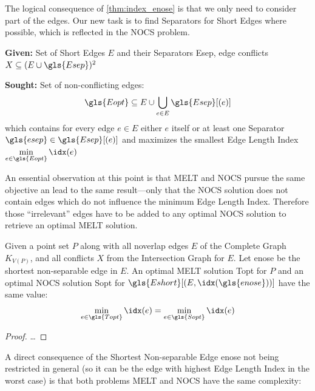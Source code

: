 The logical consequence of \cref{thm:index_enose} is that we only need
to consider part of the edges. Our new task is to find Separators for
Short Edges where possible, which is reflected in the \gls{NOCS}
problem.

\begin{problem}
  \hfill
  \begin{labeling}{\hspace{4em}}
    \item[\textbf{Given:}]
      Set of Short Edges \(E\) and their Separators \gls{Esep},
      edge conflicts \(X \subseteq (E \cup \gls{Esep})^2\)
    \item[\textbf{Sought:}]
      Set of non-conflicting edges:
      \[
        \gls{Eopt} \subseteq E
        \cup \bigcup\limits_{e \in E} \gls{Esep}[(e)]
      \]
      which contains for every edge \(e \in E\) either \(e\) itself
      or at least one Separator \(\gls{esep} \in \gls{Esep}[(e)]\)
      and maximizes the smallest Edge Length Index
      \(\min\limits_{e \in \gls{Eopt}} \idx(e)\)
  \end{labeling}
\end{problem}

An essential observation at this point is that \gls{MELT} and
\gls{NOCS} pursue the same objective an lead to the same result---only
that the \gls{NOCS} solution does not contain edges which do not
influence the minimum Edge Length Index. Therefore those
``irrelevant'' edges have to be added to any optimal \gls{NOCS}
solution to retrieve an optimal \gls{MELT} solution.

\begin{theorem}
  \label{thm:equality_melt_nocs}
  Given a point set \(P\) along with all \gls{noverlap} edges \(E\)
  of the Complete Graph \(K_{V(P)}\), and all conflicts \(X\) from the
  Intersection Graph for \(E\). 
  Let \gls{enose} be the shortest non-separable edge in \(E\).
  An optimal \gls{MELT} solution \gls{Topt} for \(P\)
  and an optimal \gls{NOCS} solution \gls{Sopt} for
  \(\gls{Eshort}[(E,\idx(\gls{enose}))]\) have the same value:
  \[
    \min\limits_{e \in \gls{Topt}} \idx(e)
    = \min\limits_{e \in \gls{Sopt}} \idx(e)
  \]
  \begin{proof}
  \ldots{}
  \end{proof}
\end{theorem}

A direct consequence of the Shortest Non-separable Edge \gls{enose}
not being restricted in general (so it can  be the edge with highest
Edge Length Index in the worst case) is that both problems \gls{MELT}
and \gls{NOCS} have the same complexity:

